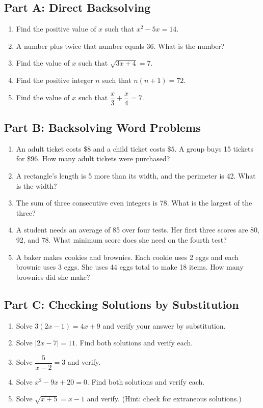 \documentclass[14pt]{extarticle}
\begin{document}
\subsection*{Part A: Direct Backsolving}
\begin{enumerate}
  \item Find the positive value of \(x\) such that \(x^2 - 5x = 14\).
  \item A number plus twice that number equals 36. What is the number?
  \item Find the value of \(x\) such that \(\sqrt{3x + 4} = 7\).
  \item Find the positive integer \(n\) such that \(n(n + 1) = 72\).
  \item Find the value of \(x\) such that \(\dfrac{x}{3} + \dfrac{x}{4} = 7\).
\end{enumerate}

\subsection*{Part B: Backsolving Word Problems}
\begin{enumerate}
  \item An adult ticket costs \(\$8\) and a child ticket costs \(\$5\). A group buys 15 tickets for \(\$96\). How many adult tickets were purchased?
  \item A rectangle's length is 5 more than its width, and the perimeter is 42. What is the width?
  \item The sum of three consecutive even integers is 78. What is the largest of the three?
  \item A student needs an average of 85 over four tests. Her first three scores are 80, 92, and 78. What minimum score does she need on the fourth test?
  \item A baker makes cookies and brownies. Each cookie uses 2 eggs and each brownie uses 3 eggs. She uses 44 eggs total to make 18 items. How many brownies did she make?
\end{enumerate}

\subsection*{Part C: Checking Solutions by Substitution}
\begin{enumerate}
  \item Solve \(3(2x - 1) = 4x + 9\) and verify your answer by substitution.
  \item Solve \(|2x - 7| = 11\). Find both solutions and verify each.
  \item Solve \(\dfrac{5}{x - 2} = 3\) and verify.
  \item Solve \(x^2 - 9x + 20 = 0\). Find both solutions and verify each.
  \item Solve \(\sqrt{x + 5} = x - 1\) and verify. (Hint: check for extraneous solutions.)
\end{enumerate}
\end{document}
